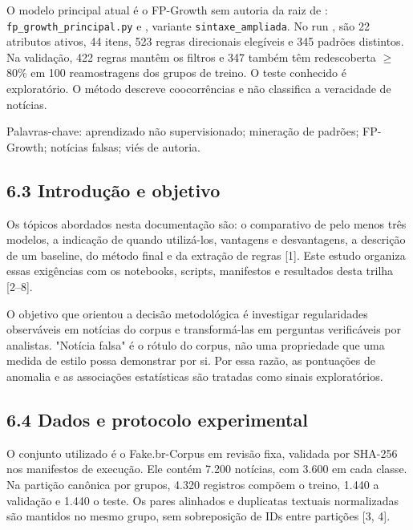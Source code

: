 \documentclass[
  brazilian,
  11pt,
]{article}
\begin{document}
O modelo principal atual é o FP-Growth sem autoria da raiz de : \texttt{fp\_growth\_principal.py} e , variante \texttt{sintaxe\_ampliada}. No run , são 22 atributos ativos, 44 itens, 523 regras direcionais elegíveis e 345 padrões distintos. Na validação, 422 regras mantêm os filtros e 347 também têm redescoberta $\geq$80\% em 100 reamostragens dos grupos de treino. O teste conhecido é exploratório. O método descreve coocorrências e não classifica a veracidade de notícias.

Palavras-chave: aprendizado não supervisionado; mineração de padrões; FP-Growth; notícias falsas; viés de autoria.

\subsection{6.3 Introdução e objetivo}\label{introduuxe7uxe3o-e-objetivo}

Os tópicos abordados nesta documentação são: o comparativo de pelo menos três modelos, a indicação de quando utilizá-los, vantagens e desvantagens, a descrição de um baseline, do método final e da extração de regras {[}1{]}. Este estudo organiza essas exigências com os notebooks, scripts, manifestos e resultados desta trilha {[}2--8{]}.

O objetivo que orientou a decisão metodológica é investigar regularidades observáveis em notícias do corpus e transformá-las em perguntas verificáveis por analistas. "Notícia falsa" é o rótulo do corpus, não uma propriedade que uma medida de estilo possa demonstrar por si. Por essa razão, as pontuações de anomalia e as associações estatísticas são tratadas como sinais exploratórios.

\subsection{6.4 Dados e protocolo experimental}\label{dados-e-protocolo-experimental}

O conjunto utilizado é o Fake.br-Corpus em revisão fixa, validada por SHA-256 nos manifestos de execução. Ele contém 7.200 notícias, com 3.600 em cada classe. Na partição canônica por grupos, 4.320 registros compõem o treino, 1.440 a validação e 1.440 o teste. Os pares alinhados e duplicatas textuais normalizadas são mantidos no mesmo grupo, sem sobreposição de IDs entre partições {[}3, 4{]}.
\end{document}
